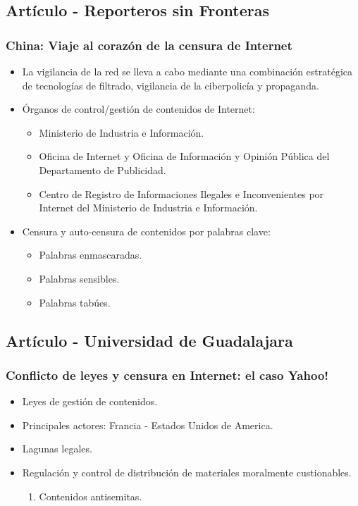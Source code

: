 \documentclass{beamer}
\begin{document}
\subsection{Art\'iculo - Reporteros sin Fronteras}
\frame
{
\transdissolve[duration=0.2]
\frametitle{China: Viaje al coraz\'on de la censura de Internet}
\begin{itemize}
	\item La vigilancia de la red se lleva a cabo mediante una combinaci\'on estrat\'egica de tecnolog\'ias de filtrado, vigilancia de la ciberpolic\'ia y propaganda.
	\item \'Organos de control/gesti\'on de contenidos de Internet:
	\begin{itemize}
		\item Ministerio de Industria e Informaci\'on.
		\item Oficina de Internet y Oficina de Informaci\'on y Opini\'on P\'ublica del Departamento de Publicidad.
		\item Centro de Registro de Informaciones Ilegales e Inconvenientes por Internet del Ministerio de Industria e Informaci\'on.
	\end{itemize}
	\item Censura y auto-censura de contenidos por palabras clave:
	\begin{itemize}
		\item Palabras enmascaradas.
		\item Palabras sensibles.
		\item Palabras tab\'ues.
	\end{itemize}
\end{itemize}
}

\subsection{Art\'iculo - Universidad de Guadalajara}
\frame
{
\transdissolve[duration=0.2]
\frametitle{Conflicto de leyes y censura en Internet: el caso Yahoo!}
\begin{itemize}
	\item Leyes de gesti\'on de contenidos.
	\item Principales actores: Francia - Estados Unidos de America.
	\item Lagunas legales.
	\item Regulaci\'on y control de distribuci\'on de materiales moralmente custionables.
	\begin{enumerate}
		\item Contenidos antisemitas.
	\end{enumerate}
\end{itemize}
}
\end{document}
